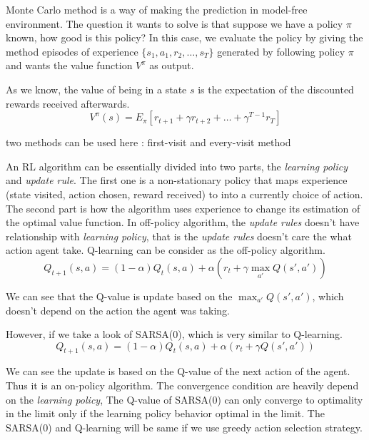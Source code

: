 \documentclass[9pt]{article}
\begin{document}
 Monte Carlo method is a way of making the prediction in model-free environment. The question it wants to solve is that suppose we have a policy $\pi$ known, how good is this policy? In this case, we evaluate the policy by giving the method episodes of experience $\{s_1,a_1,r_2,\ldots,s_T\}$ generated by following policy $\pi$ and wants the value function $V^{\pi}$ as output.

As we know, the value of being in a state $s$ is the expectation of the discounted rewards received afterwards. 
\[
V^{\pi}(s) = E_{\pi}[r_{t+1} + \gamma r_{t+2} + \ldots + \gamma^{T-1}r_T]
\]

two methods can be used here : first-visit and every-visit method



An RL algorithm can be essentially divided into two parts, the \textit{learning policy} and \textit{update rule}. The first one is a non-stationary policy that maps experience (state visited, action chosen, reward received) to into a currently choice of action. The second part is how the algorithm uses experience to change its estimation of the optimal value function.
In off-policy algorithm, the \textit{update rules} doesn't have relationship with \textit{learning policy}, that is the \textit{update rules} doesn't care the what action agent take. Q-learning can be consider as the off-policy algorithm.
\begin{displaymath}
  Q_{t+1}(s,a) = (1-\alpha)Q_{t}(s,a)+\alpha(r_t+\gamma \max_{a'}Q(s',a'))
\end{displaymath}

We can see that the Q-value is update based on the $\max_{a'}Q(s',a')$, which doesn't depend on the action the agent was taking.

However, if we take a look of SARSA(0), which is very similar to Q-learning.
\begin{displaymath}
  Q_{t+1}(s,a) = (1-\alpha)Q_{t}(s,a)+\alpha(r_t+\gamma Q(s',a'))
\end{displaymath}

We can see the update is based on the Q-value of the next action of the agent. Thus it is an on-policy algorithm. The convergence condition are heavily depend on the \textit{learning policy}, The Q-value of SARSA(0) can only converge to optimality in the limit only if the learning policy behavior optimal in the limit. The SARSA(0) and Q-learning will be same if we use greedy action selection strategy.
\end{document}
